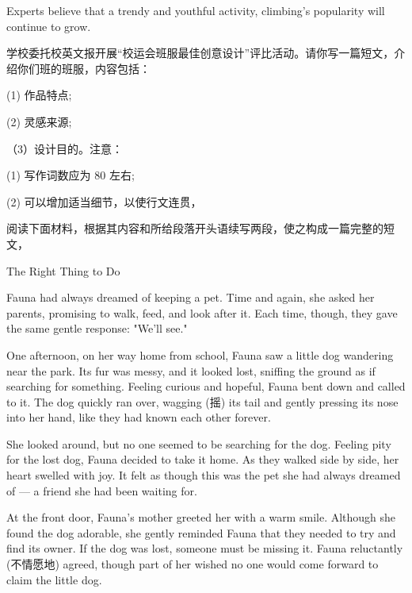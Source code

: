 \documentclass{英语试卷}
\begin{document}
\par Experts believe that  a trendy and youthful activity, climbing's popularity will continue to grow.\par
{}
\par 学校委托校英文报开展“校运会班服最佳创意设计”评比活动。请你写一篇短文，介绍你们班的班服，内容包括：\par
\par (1) 作品特点;\par
\par (2) 灵感来源;\par
\par （3）设计目的。注意：\par
\par (1) 写作词数应为 80 左右;\par
\par (2) 可以增加适当细节，以使行文连贯，\par
{}
\par 阅读下面材料，根据其内容和所给段落开头语续写两段，使之构成一篇完整的短文，\par
\par The Right Thing to Do\par
\par Fauna had always dreamed of keeping a pet. Time and again, she asked her parents, promising to walk, feed, and look after it. Each time, though, they gave the same gentle response: "We'll see."\par
\par One afternoon, on her way home from school, Fauna saw a little dog wandering near the park. Its fur was messy, and it looked lost, sniffing the ground as if searching for something. Feeling curious and hopeful, Fauna bent down and called to it. The dog quickly ran over, wagging (摇) its tail and gently pressing its nose into her hand, like they had known each other forever.\par
\par She looked around, but no one seemed to be searching for the dog. Feeling pity for the lost dog, Fauna decided to take it home. As they walked side by side, her heart swelled with joy. It felt as though this was the pet she had always dreamed of — a friend she had been waiting for.\par
\par At the front door, Fauna's mother greeted her with a warm smile. Although she found the dog adorable, she gently reminded Fauna that they needed to try and find its owner. If the dog was lost, someone must be missing it. Fauna reluctantly (不情愿地) agreed, though part of her wished no one would come forward to claim the little dog.\par
\end{document}
